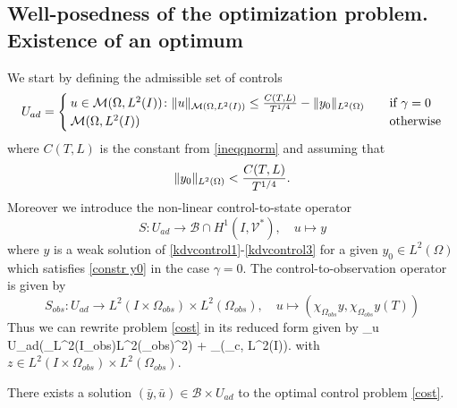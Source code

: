 \subsection{Well-posedness of the optimization problem. Existence of an optimum}
We start by defining the admissible set of controls
$$U_{ad} = \begin{cases} u \in \mathcal{M}(\Omega, L^{2}(I))\colon \lVert u\rVert_{\mathcal{M}(\Omega, L^{2}(I))} \leq \frac{C(T,L)}{T^{1/4}}-\lVert y_0\rVert_{L^2(\Omega)} &\quad\mbox{if } \gamma = 0 \\
\mathcal{M}(\Omega, L^{2}(I)) & \quad \mbox{otherwise}
 \end{cases}$$
where $C(T,L)$ is the constant from \eqref{ineqqnorm} and assuming that
\begin{equation}\label{constr y0}
\lVert y_0\rVert_{L^2(\Omega)}< \frac{C(T,L)}{T^{1/4}}.
\end{equation}
Moreover we introduce the non-linear control-to-state operator
\[S\colon U_{ad}\rightarrow \mathcal B\cap H^1(I,\mathcal V^\ast),\quad u\mapsto y\]
where $y$ is a weak solution of \eqref{kdvcontrol1}-\eqref{kdvcontrol3} for a given $y_0\in L^2(\Omega)$ which satisfies
\eqref{constr y0} in the case $\gamma =0$. The control-to-observation operator is given by
\[
S_{obs}\colon U_{ad}\rightarrow L^2(I\times \Omega_{obs})\times L^2(\Omega_{obs}),\quad u\mapsto(\chi_{\Omega_{obs}}y,\chi_{\Omega_{obs}}y(T))
\]
Thus we can rewrite problem \eqref{cost} in its reduced form given by
\be
\min_{u \in U_{ad}}\left(_{L^2(I\times \Omega_{obs})\times L^2(\Omega_{obs})}^2\right) + \alpha {}_{(\Omega_{c}, L^{2}(I))}.
\label{red cost}
\ee
with $z\in L^2(I\times \Omega_{obs})\times L^2(\Omega_{obs})$.
\begin{prop}
There exists a solution $(\bar y,\bar u) \in \mathcal B\times U_{ad}$ to the optimal control problem \eqref{cost}.
\end{prop}

